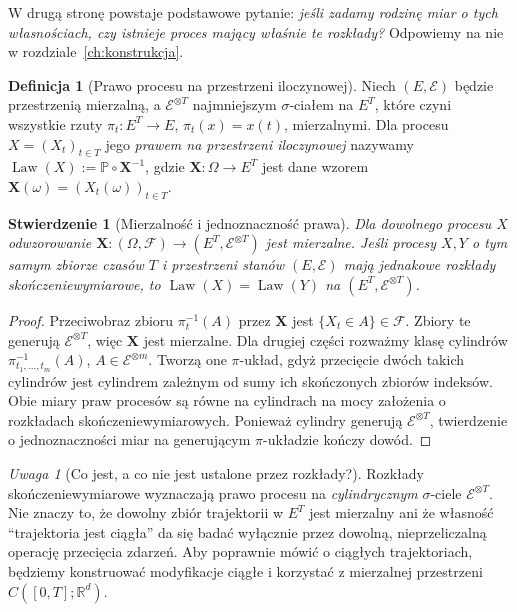 \documentclass[11pt,a4paper,oneside]{report}
\numberwithin{equation}{chapter}
\theoremstyle{plain}
\newtheorem{stwierdzenie}[twierdzenie]{Stwierdzenie}
\theoremstyle{definition}
\newtheorem{definicja}{Definicja}[chapter]
\theoremstyle{remark}
\newtheorem{uwaga}{Uwaga}[chapter]
\newcommand{\R}{\mathbb{R}}
\newcommand{\Prob}{\mathbb{P}}
\newcommand{\Law}{\operatorname{Law}}
\newcommand{\calF}{\mathcal{F}}
\newcommand{\calE}{\mathcal{E}}
\begin{document}
W drugą stronę powstaje podstawowe pytanie: \emph{jeśli zadamy
rodzinę miar o tych własnościach, czy istnieje proces mający właśnie
te rozkłady?} Odpowiemy na nie w rozdziale~\ref{ch:konstrukcja}.

\begin{definicja}[Prawo procesu na przestrzeni iloczynowej]
Niech $(E,\calE)$ będzie przestrzenią mierzalną, a
$\calE^{\otimes T}$ najmniejszym $\sigma$-ciałem na $E^T$,
które czyni wszystkie rzuty $\pi_t:E^T\to E$, $\pi_t(x)=x(t)$,
mierzalnymi. Dla procesu $X=(X_t)_{t\in T}$ jego
\emph{prawem na przestrzeni iloczynowej} nazywamy
$\Law(X):=\Prob\circ\mathbf X^{-1}$, gdzie
$\mathbf X:\Omega\to E^T$ jest dane wzorem
$\mathbf X(\omega)=(X_t(\omega))_{t\in T}$.
\end{definicja}

\begin{stwierdzenie}[Mierzalność i jednoznaczność prawa]
Dla dowolnego procesu $X$ odwzorowanie
$\mathbf X:(\Omega,\calF)\to(E^T,\calE^{\otimes T})$ jest
mierzalne. Jeśli procesy $X,Y$ o tym samym zbiorze czasów $T$
i przestrzeni stanów $(E,\calE)$ mają jednakowe rozkłady
skończeniewymiarowe, to $\Law(X)=\Law(Y)$ na
$(E^T,\calE^{\otimes T})$.
\end{stwierdzenie}
\begin{proof}
Przeciwobraz zbioru $\pi_t^{-1}(A)$ przez $\mathbf X$ jest
$\{X_t\in A\}\in\calF$. Zbiory te generują $\calE^{\otimes T}$,
więc $\mathbf X$ jest mierzalne. Dla drugiej części rozważmy
klasę cylindrów $\pi_{t_1,\ldots,t_m}^{-1}(A)$,
$A\in\calE^{\otimes m}$. Tworzą one $\pi$-układ, gdyż przecięcie
dwóch takich cylindrów jest cylindrem zależnym od sumy ich
skończonych zbiorów indeksów. Obie miary praw procesów
są równe na cylindrach na mocy założenia o rozkładach
skończeniewymiarowych. Ponieważ cylindry generują
$\calE^{\otimes T}$, twierdzenie o jednoznaczności miar
na generującym $\pi$-układzie kończy dowód.
\end{proof}

\begin{uwaga}[Co jest, a co nie jest ustalone przez rozkłady?]
Rozkłady skończeniewymiarowe wyznaczają prawo procesu na
\emph{cylindrycznym} $\sigma$-ciele $\calE^{\otimes T}$.
Nie znaczy to, że dowolny zbiór trajektorii w $E^T$ jest mierzalny
ani że własność ``trajektoria jest ciągła'' da się badać
wyłącznie przez dowolną, nieprzeliczalną operację przecięcia
zdarzeń. Aby poprawnie mówić o ciągłych trajektoriach, będziemy
konstruować modyfikacje ciągłe i korzystać z mierzalnej przestrzeni
$C([0,T];\R^d)$.
\end{uwaga}
\end{document}
